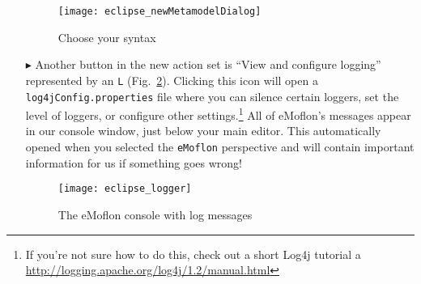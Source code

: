 \begin{itemize}
\begin{figure}[htbp]
	\centering
  \texttt{[image: eclipse\_newMetamodelDialog]}
	\caption{Choose your syntax}
	\label{fig_chooseSyntax}
\end{figure} 

\item[$\blacktriangleright$]  Another button in the new action set is ``View and configure logging'' represented by an \texttt{L} (Fig.~\ref{fig_logger}).
Clicking this icon will open a \texttt{log4jConfig.properties} file where you can silence certain loggers, set the level of loggers, or configure other
settings.\footnote{If you're not sure how to do this, check out a short Log4j tutorial a \url{http://logging.apache.org/log4j/1.2/manual.html}} All of eMoflon's
messages appear in our console window, just below your main editor. This automatically opened when you selected the \texttt{eMoflon} perspective and
will contain important information for us if something goes wrong!

\newpage
\vspace*{3cm}
\begin{figure}[htbp]
	\centering
  \texttt{[image: eclipse\_logger]}
	\caption{The eMoflon console with log messages}
	\label{fig_logger}
\end{figure} 
\end{itemize}





